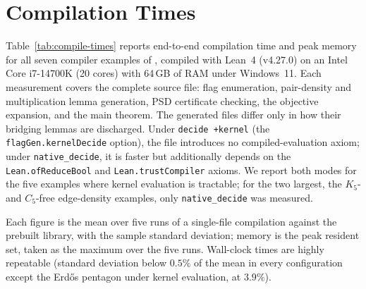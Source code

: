 \documentclass{article}
\newcommand{\lean}[1]{\texttt{#1}}
\begin{document}
\appendix
\section{Compilation Times}
\label{sec:compile-times}

Table~\ref{tab:compile-times} reports end-to-end compilation time and peak
memory for all seven compiler examples of , compiled with
Lean~4 (v4.27.0) on an
Intel Core i7-14700K (20 cores) with 64\,GB of RAM under Windows~11.  Each
measurement covers the complete source file: flag enumeration, pair-density and
multiplication lemma generation, PSD certificate checking, the objective
expansion, and the main theorem.  The generated files differ only in how their
bridging lemmas are discharged.  Under \lean{decide +kernel} (the
\lean{flagGen.kernelDecide} option), the file introduces no compiled-evaluation
axiom; under \lean{native\_decide}, it is faster but additionally depends on the
\lean{Lean.ofReduceBool} and \lean{Lean.trustCompiler} axioms.  We report both
modes for the five examples where kernel evaluation is tractable; for the two
largest, the $K_5$- and $C_5$-free edge-density examples, only
\lean{native\_decide} was measured.

Each figure is the mean over five runs of a single-file compilation against the
prebuilt library, with the sample standard deviation; memory is the peak
resident set, taken as the maximum over the five runs.  Wall-clock times are
highly repeatable (standard deviation below $0.5\%$ of the mean in every
configuration except the Erd\H{o}s pentagon under kernel evaluation, at
$3.9\%$).
\end{document}
